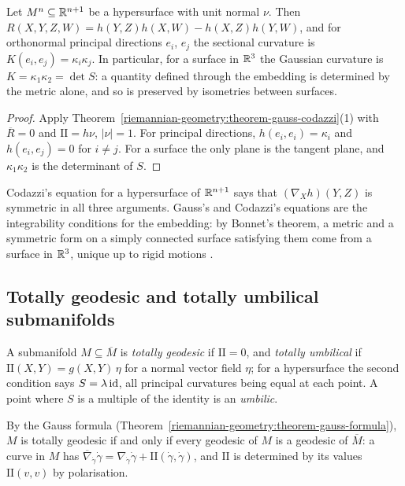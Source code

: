 \begin{corollary}\label{riemannian-geometry:corollary-theorema-egregium}
Let $M^n \subseteq \mathbb{R}^{n+1}$ be a hypersurface with unit normal $\nu$. Then
$R(X, Y, Z, W) = h(Y, Z)h(X, W) - h(X, Z)h(Y, W)$, and for orthonormal principal directions $e_i$, $e_j$ the sectional curvature is $K(e_i, e_j) = \kappa_i\kappa_j$. In
particular, for a surface in $\mathbb{R}^3$ the Gaussian curvature is $K = \kappa_1\kappa_2 = \det S$: a quantity defined through the embedding is determined by the metric
alone, and so is preserved by isometries between surfaces.
\end{corollary}

\begin{proof}
Apply Theorem~\ref{riemannian-geometry:theorem-gauss-codazzi}(1) with $\overline{R} = 0$ and $\mathrm{II} = h\nu$, $|\nu| = 1$. For principal directions,
$h(e_i, e_i) = \kappa_i$ and $h(e_i, e_j) = 0$ for $i \neq j$. For a surface the only plane is the tangent plane, and $\kappa_1\kappa_2$ is the determinant of $S$.
\end{proof}

Codazzi's equation for a hypersurface of $\mathbb{R}^{n+1}$ says that $(\nabla_Xh)(Y, Z)$ is symmetric in all three arguments. Gauss's and Codazzi's equations are the
integrability conditions for the embedding: by Bonnet's theorem, a metric and a symmetric form on a simply connected surface satisfying them come from a surface
in $\mathbb{R}^3$, unique up to rigid motions \cite[Chapter 4]{do-carmo-curves-surfaces}.

\subsection{Totally geodesic and totally umbilical submanifolds}\label{riemannian-geometry:subsection-umbilical}

\begin{definition}\label{riemannian-geometry:definition-umbilical}
A submanifold $M \subseteq \overline{M}$ is \emph{totally geodesic} if $\mathrm{II} = 0$, and \emph{totally umbilical} if $\mathrm{II}(X, Y) = g(X, Y)\,\eta$ for a normal vector field $\eta$; for a hypersurface
the second condition says $S = \lambda\,\mathrm{id}$, all principal curvatures being equal at each point. A point where $S$ is a multiple of the identity is an \emph{umbilic}.
\end{definition}

By the Gauss formula (Theorem~\ref{riemannian-geometry:theorem-gauss-formula}), $M$ is totally geodesic if and only if every geodesic of $M$ is a geodesic of $\overline{M}$: a curve in $M$ has
$\overline{\nabla}_{\dot\gamma}\dot\gamma = \nabla_{\dot\gamma}\dot\gamma + \mathrm{II}(\dot\gamma, \dot\gamma)$, and $\mathrm{II}$ is determined by its values $\mathrm{II}(v, v)$ by polarisation.

